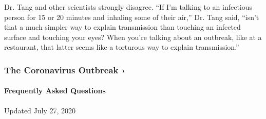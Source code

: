 Dr. Tang and other scientists strongly disagree. ``If I'm talking to an
infectious person for 15 or 20 minutes and inhaling some of their air,''
Dr. Tang said, ``isn't that a much simpler way to explain transmission
than touching an infected surface and touching your eyes? When you're
talking about an outbreak, like at a restaurant, that latter seems like
a torturous way to explain transmission.''

\href{https://www.nytimes3xbfgragh.onion/news-event/coronavirus?action=click\&pgtype=Article\&state=default\&region=MAIN_CONTENT_3\&context=storylines_faq}{}

\hypertarget{the-coronavirus-outbreak-}{%
\subsubsection{The Coronavirus Outbreak
›}\label{the-coronavirus-outbreak-}}

\hypertarget{frequently-asked-questions}{%
\paragraph{Frequently Asked
Questions}\label{frequently-asked-questions}}

Updated July 27, 2020

